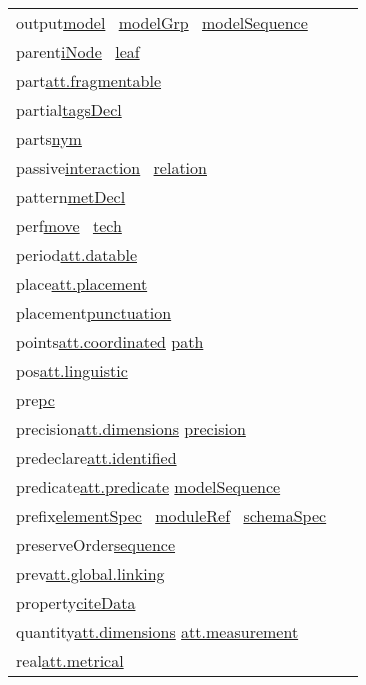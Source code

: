 \begin{longtable}{L{.2\textwidth}P{.8\textwidth}}
output\tabcellsep \hyperref[TEI.model]{model}  \hyperref[TEI.modelGrp]{modelGrp}  \hyperref[TEI.modelSequence]{modelSequence} \\
parent\tabcellsep \hyperref[TEI.iNode]{iNode}  \hyperref[TEI.leaf]{leaf} \\
part\tabcellsep \hyperref[TEI.att.fragmentable]{att.fragmentable}\\
partial\tabcellsep \hyperref[TEI.tagsDecl]{tagsDecl} \\
parts\tabcellsep \hyperref[TEI.nym]{nym} \\
passive\tabcellsep \hyperref[TEI.interaction]{interaction}  \hyperref[TEI.relation]{relation} \\
pattern\tabcellsep \hyperref[TEI.metDecl]{metDecl} \\
perf\tabcellsep \hyperref[TEI.move]{move}  \hyperref[TEI.tech]{tech} \\
period\tabcellsep \hyperref[TEI.att.datable]{att.datable}\\
place\tabcellsep \hyperref[TEI.att.placement]{att.placement}\\
placement\tabcellsep \hyperref[TEI.punctuation]{punctuation} \\
points\tabcellsep \hyperref[TEI.att.coordinated]{att.coordinated} \hyperref[TEI.path]{path} \\
pos\tabcellsep \hyperref[TEI.att.linguistic]{att.linguistic}\\
pre\tabcellsep \hyperref[TEI.pc]{pc} \\
precision\tabcellsep \hyperref[TEI.att.dimensions]{att.dimensions} \hyperref[TEI.precision]{precision} \\
predeclare\tabcellsep \hyperref[TEI.att.identified]{att.identified}\\
predicate\tabcellsep \hyperref[TEI.att.predicate]{att.predicate} \hyperref[TEI.modelSequence]{modelSequence} \\
prefix\tabcellsep \hyperref[TEI.elementSpec]{elementSpec}  \hyperref[TEI.moduleRef]{moduleRef}  \hyperref[TEI.schemaSpec]{schemaSpec} \\
preserveOrder\tabcellsep \hyperref[TEI.sequence]{sequence} \\
prev\tabcellsep \hyperref[TEI.att.global.linking]{att.global.linking}\\
property\tabcellsep \hyperref[TEI.citeData]{citeData} \\
quantity\tabcellsep \hyperref[TEI.att.dimensions]{att.dimensions} \hyperref[TEI.att.measurement]{att.measurement}\\
real\tabcellsep \hyperref[TEI.att.metrical]{att.metrical}\\

\end{longtable}
